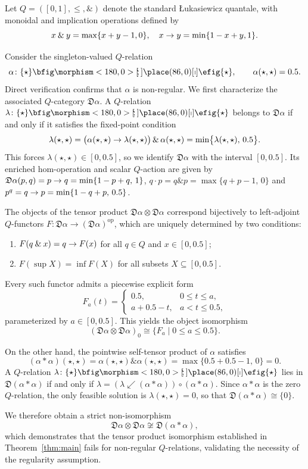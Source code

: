 \documentclass{tac}
\begin{document}
\begin{example}
Let $Q=([0,1],\leq,\&)$ denote the standard Łukasiewicz quantale, with monoidal and implication operations defined by
\[
x\mathbin{\&} y=\max\{x+y-1,0\},\quad x\rightarrow y=\min\{1-x+y,1\}.
\]

Consider the singleton-valued $Q$-relation
\[
\alpha\colon\sigt\nto\sigt,\qquad \alpha(\star,\star)=0.5.
\]
Direct verification confirms that $\alpha$ is non-regular. We first characterize the associated $Q$-category $\mathfrak{D}\alpha$. A $Q$-relation $\lambda\colon\sigt\nto\sigt$ belongs to $\mathfrak{D}\alpha$ if and only if it satisfies the fixed-point condition
\[
\lambda(\star,\star)=\bigl(\alpha(\star,\star)\rightarrow\lambda(\star,\star)\bigr)\,\&\, \alpha(\star,\star)
=\min\bigl\{\lambda(\star,\star),\,0.5\bigr\}.
\]
This forces $\lambda(\star,\star)\in[0,0.5]$, so we identify $\mathfrak{D}\alpha$ with the interval $[0,0.5]$. Its enriched hom-operation and scalar $Q$-action are given by
$\mathfrak{D}\alpha(p,q)=p\rightarrow q=\min\{1-p+q,\,1\}$,
 $q\cdot p=q\mathbin{\&} p=\max\{q+p-1,\,0\}$ and $p^{q}=q\rightarrow p=\min\{1-q+p,\,0.5\}$.


The objects of the tensor product $\mathfrak{D}\alpha\otimes\mathfrak{D}\alpha$ correspond bijectively to left-adjoint $Q$-functors $F\colon\mathfrak{D}\alpha\to(\mathfrak{D}\alpha)^{\mathrm{op}}$, which are uniquely determined by two conditions:
\begin{enumerate}[label=(\arabic*)]
\item $F(q\mathbin{\&} x)=q\rightarrow F(x)$ for all $q\in Q$ and $x\in[0,0.5]$;
\item $F(\sup X)=\inf F(X)$ for all subsets $X\subseteq[0,0.5]$.
\end{enumerate}

Every such functor admits a piecewise explicit form
\[
F_a(t)=
\begin{cases}
0.5, & 0\leq t\leq a,\\
a+0.5-t, & a<t\leq 0.5,
\end{cases}
\]
parameterized by $a\in[0,0.5]$. This yields the object isomorphism
\[
(\mathfrak{D}\alpha\otimes\mathfrak{D}\alpha)_0\cong\{F_a\mid 0\leq a\leq 0.5\}.
\]

On the other hand, the pointwise self-tensor product of $\alpha$ satisfies
\[
(\alpha*\alpha)(\star,\star)=\alpha(\star,\star)\mathbin{\&}\alpha(\star,\star)
=\max\{0.5+0.5-1,\,0\}=0.
\]
A $Q$-relation $\lambda\colon\sigt\nto\sigt$ lies in $\mathfrak{D}(\alpha*\alpha)$ if and only if $\lambda=(\lambda\swarrow(\alpha*\alpha))\circ(\alpha*\alpha)$. Since $\alpha*\alpha$ is the zero $Q$-relation, the only feasible solution is $\lambda(\star,\star)=0$, so that $\mathfrak{D}(\alpha*\alpha)\cong\{0\}$.

We therefore obtain a strict non-isomorphism
\[
\mathfrak{D}\alpha\otimes\mathfrak{D}\alpha\not\cong\mathfrak{D}(\alpha*\alpha),
\]
which demonstrates that the tensor product isomorphism established in Theorem~\ref{thm:main} fails for non-regular $Q$-relations, validating the necessity of the regularity assumption.
\end{example}
  
 
    
    

 



\end{document}
